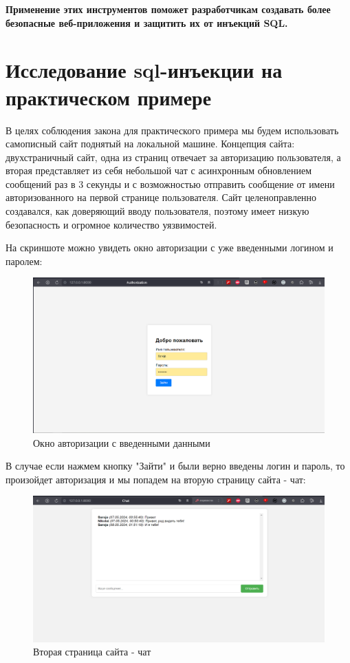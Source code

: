 \documentclass[a4paper,12pt]{diplom}
\begin{document}
	 \textbf{Применение этих инструментов поможет разработчикам создавать более безопасные веб-приложения и защитить их от инъекций SQL.} 
	 
	 
	 
	 
	 \section{Исследование sql-инъекции на практическом примере}
	 
	 В целях соблюдения закона для практического примера мы будем использовать самописный сайт поднятый на локальной машине. Концепция сайта: двухстраничный сайт, одна из страниц отвечает за авторизацию пользователя, а вторая представляет из себя небольшой чат с асинхронным обновлением сообщений раз в 3 секунды и с возможностью отправить сообщение от имени авторизованного на первой странице пользователя. Сайт целеноправленно создавался, как доверяющий вводу пользователя, поэтому имеет низкую безопасность и огромное количество уязвимостей.
	 
	 На скриншоте можно увидеть окно авторизации с уже введенными логином и паролем:
	 
	 \begin{figure}[!ht]
	 	\centering
	 	\includegraphics[width=1\textwidth]{auth.png}
	 	\caption{Окно авторизации с введенными данными}
	 	\label{fig:auth}
	 \end{figure}
	 
	 В случае если нажмем кнопку "Зайти" и были верно введены логин и пароль, то произойдет авторизация и мы попадем на вторую страницу сайта - чат:
	 
	 \begin{figure}[!ht]
	 	\centering
	 	\includegraphics[width=1\textwidth]{chat.png}
	 	\caption{Вторая страница сайта - чат}
	 	\label{fig:chat}
	 \end{figure}
	 
\end{document}
